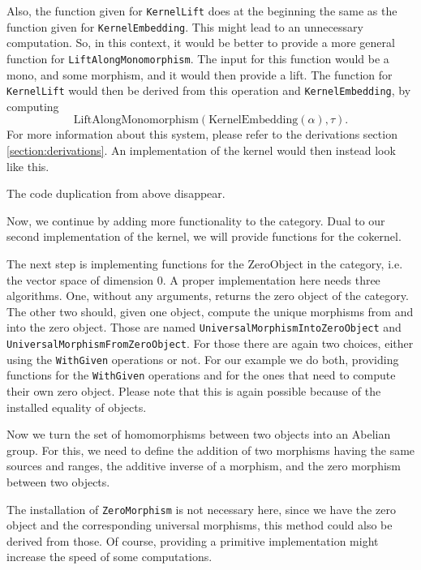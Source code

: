 Also, the function given for \texttt{KernelLift} does at the beginning the same as the function given for \texttt{KernelEmbedding}. This might lead to
an unnecessary computation. So, in this context, it would be better to provide a more general function for \texttt{LiftAlongMonomorphism}.
The input for this function would be a mono, and some morphism, and it would then provide a lift. The function for \texttt{KernelLift} would then be derived
from this operation and \texttt{KernelEmbedding}, by computing
\[
 \mathrm{LiftAlongMonomorphism} \left( \mathrm{KernelEmbedding} \left( \alpha \right), \tau \right).
\]
For more information about this system, please refer to the derivations section \ref{section:derivations}.
An implementation of the kernel would then instead look like this.



The code duplication from above disappear.

Now, we continue by adding more functionality to the category. Dual to our second implementation of the kernel,
we will provide functions for the cokernel.



The next step is implementing functions for the \textrm{ZeroObject} in the category, i.e. the vector space
of dimension 0. A proper implementation here needs three algorithms. One, without any arguments, returns the
zero object of the category. The other two should, given one object, compute the unique morphisms from and into
the zero object. Those are named \texttt{UniversalMorphismIntoZeroObject} and \texttt{UniversalMorphismFromZeroObject}.
For those there are again two choices, either using the \texttt{WithGiven} operations or not.
For our example we do both, providing functions for the \texttt{WithGiven} operations and for the ones that
need to compute their own zero object. Please note that this is again possible because of the installed equality of objects.



Now we turn the set of homomorphisms between two objects into an Abelian group. For this, we need to define the addition of
two morphisms having the same sources and ranges, the additive inverse of a morphism, and the zero morphism between two objects.



The installation of \texttt{ZeroMorphism} is not necessary here, since we have the zero object and the corresponding
universal morphisms, this method could also be derived from those. Of course, providing a primitive implementation might
increase the speed of some computations.

